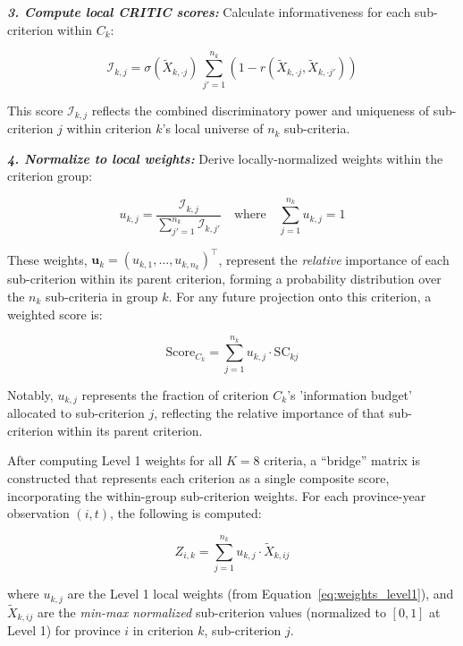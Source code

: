 \documentclass[12pt,a4paper]{article}
\begin{document}
\textit{\textbf{3. Compute local CRITIC scores:}} Calculate informativeness for each sub-criterion within $C_k$:

\begin{equation}
\label{eq:critic_level1}
\mathcal{I}_{k,j} = \sigma(\tilde{X}_{k,\cdot j}) \, \sum_{j'=1}^{n_k} \left(1 - r(\tilde{X}_{k,\cdot j}, \tilde{X}_{k,\cdot j'})\right)
\end{equation}

This score $\mathcal{I}_{k,j}$ reflects the combined discriminatory power and uniqueness of sub-criterion $j$ within criterion $k$'s local universe of $n_k$ sub-criteria.

\textit{\textbf{4. Normalize to local weights:}} Derive locally-normalized weights within the criterion group:

\begin{equation}
\label{eq:weights_level1}
u_{k,j} = \frac{\mathcal{I}_{k,j}}{\sum_{j'=1}^{n_k} \mathcal{I}_{k,j'}} \quad \text{where} \quad \sum_{j=1}^{n_k} u_{k,j} = 1
\end{equation}

These weights, $\mathbf{u}_k = (u_{k,1}, \ldots, u_{k,n_k})^\top$, represent the \emph{relative} importance of each sub-criterion within its parent criterion, forming a probability distribution over the $n_k$ sub-criteria in group $k$. For any future projection onto this criterion, a weighted score is:

\begin{equation}
\text{Score}_{C_k} = \sum_{j=1}^{n_k} u_{k,j} \cdot \text{SC}_{kj}
\end{equation}

Notably, $u_{k,j}$ represents the fraction of criterion $C_k$'s 'information budget' allocated to sub-criterion $j$, reflecting the relative importance of that sub-criterion within its parent criterion.

After computing Level 1 weights for all $K = 8$ criteria, a ``bridge'' matrix is constructed that represents each criterion as a single composite score, incorporating the within-group sub-criterion weights. For each province-year observation $(i, t)$, the following is computed:

\begin{equation}
\label{eq:criterion_composite}
Z_{i,k} = \sum_{j=1}^{n_k} u_{k,j} \cdot \tilde{X}_{k,ij}
\end{equation}

where $u_{k,j}$ are the Level 1 local weights (from Equation~\eqref{eq:weights_level1}), and $\tilde{X}_{k,ij}$ are the \emph{min-max normalized} sub-criterion values (normalized to $[0,1]$ at Level 1) for province $i$ in criterion $k$, sub-criterion $j$.
\end{document}
